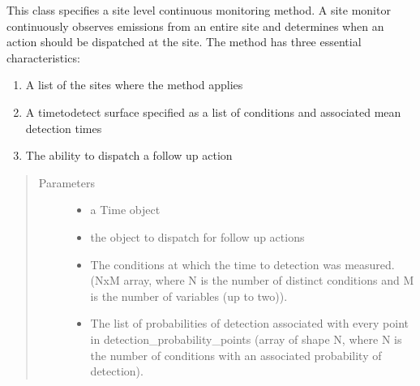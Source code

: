 \documentclass[letterpaper,10pt,english]{sphinxmanual}
\begin{document}
\begin{fulllineitems}
\label{\detokenize{index:feast.DetectionModules.site_monitor.SiteMonitor}}
This class specifies a site level continuous monitoring method. A site monitor continuously observes
emissions from an entire site and determines when an action should be dispatched at the site.
The method has three essential characteristics:
\begin{enumerate}
%
\item {} 
A list of the sites where the method applies

\item {} 
A time\sphinxhyphen{}to\sphinxhyphen{}detect surface specified as a list of conditions and associated mean detection times

\item {} 
The ability to dispatch a follow up action

\end{enumerate}
\begin{quote}\begin{description}
\item[{Parameters}] \leavevmode\begin{itemize}
\item {} 
 \textendash{} a Time object

\item {} 
 \textendash{} the object to dispatch for follow up actions

\item {} 
 \textendash{} The conditions at which the time to detection was measured. (NxM array,
where N is the number of distinct conditions and M is the number of variables (up to two)).

\item {} 
 \textendash{} The list of probabilities of detection associated with every point in
detection\_probability\_points (array of shape N, where N is the number of conditions with an associated
probability of detection).


\end{itemize}
\end{description}
\end{quote}
\end{fulllineitems}
\end{document}
